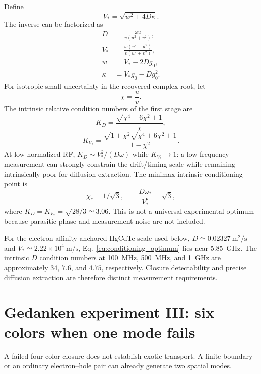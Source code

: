 \documentclass[11pt]{article}
\begin{document}
Define
\begin{equation}
V_*=\sqrt{w^2+4D\kappa}.
\end{equation}
The inverse can be factorized as
\begin{align}
D&=\boxed{\frac{\omega u}{v(u^2+v^2)}},\\
V_*&=\boxed{\frac{\omega(v^2-u^2)}{v(u^2+v^2)}},\\
w&=V_*-2Dg_0,\\
\kappa&=V_*g_0-Dg_0^2.
\end{align}
For isotropic small uncertainty in the recovered complex root, let
\begin{equation}
\chi=\frac{u}{v}.
\end{equation}
The intrinsic relative condition numbers of the first stage are
\begin{equation}
\boxed{K_D=\frac{\sqrt{\chi^4+6\chi^2+1}}{\chi},}
\end{equation}
\begin{equation}
\boxed{K_{V_*}=\frac{\sqrt{1+\chi^2}\sqrt{\chi^4+6\chi^2+1}}{1-\chi^2}.}
\end{equation}
At low normalized RF, $K_D\sim V_*^2/(D\omega)$ while $K_{V_*}\to1$: a low-frequency measurement can strongly constrain the drift/timing scale while remaining intrinsically poor for diffusion extraction. The minimax intrinsic-conditioning point is
\begin{equation}
\boxed{\chi_*=1/\sqrt3,\qquad \frac{D\omega_*}{V_*^2}=\sqrt3,}
\label{eq:conditioning_optimum}
\end{equation}
where $K_D=K_{V_*}=\sqrt{28/3}\simeq3.06$. This is not a universal experimental optimum because parasitic phase and measurement noise are not included.

For the electron-affinity-anchored HgCdTe scale used below, $D\simeq0.02327~\mathrm{m^2/s}$ and $V_*\simeq2.22\times10^4~\mathrm{m/s}$, Eq.~\eqref{eq:conditioning_optimum} lies near \SI{5.85}{GHz}. The intrinsic $D$ condition numbers at \SI{100}{MHz}, \SI{500}{MHz}, and \SI{1}{GHz} are approximately $34$, $7.6$, and $4.75$, respectively. Closure detectability and precise diffusion extraction are therefore distinct measurement requirements.

\section{Gedanken experiment III: six colors when one mode fails}

A failed four-color closure does not establish exotic transport. A finite boundary or an ordinary electron--hole pair can already generate two spatial modes.
\end{document}

